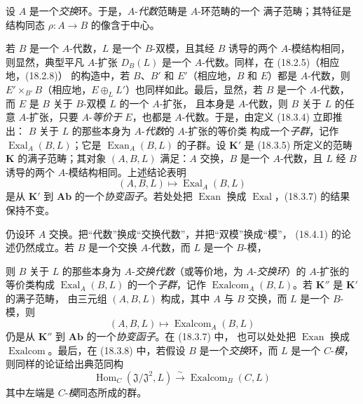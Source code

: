 \begin{env}[18.4.1]
\label{0.18.4.1-fr}
设 $A$ 是一个\emph{交换}环。于是，$A$-\emph{代数}范畴是 $A$-环范畴的一个
满子范畴；其特征是结构同态 $\rho:A\to B$ 的像含于中心。

若 $B$ 是一个 $A$-代数，$L$ 是一个 $B$-双模，且其经 $B$ 诱导的两个
$A$-模结构相同，则显然，典型平凡
$A$-扩张 $D_B(L)$ 是一个 $A$-代数。同样，在 (18.2.5)（相应地，(18.2.8)）
的构造中，若 $B$、$B'$ 和 $E'$（相应地，$B$ 和 $E$）都是 $A$-代数，则
$E'\times_{B'}B$（相应地，$E\oplus_LL'$）也同样如此。最后，显然，若
$B$ 是一个 $A$-代数，而 $E$ 是 $B$ 关于 $B$-双模 $L$ 的一个 $A$-扩张，
且本身是 $A$-代数，则 $B$ 关于 $L$ 的任意 $A$-扩张，只要
$A$-\emph{等价于} $E$，也都是 $A$-代数。于是，由定义 (18.3.4) 立即推出：
$B$ 关于 $L$ 的那些本身为 $A$-\emph{代数}的 $A$-扩张的等价类
构成一个\emph{子群}，记作 $\operatorname{Exal}_A(B,L)$；它是
$\operatorname{Exan}_A(B,L)$ 的子群。设 $\mathbf K'$ 是 (18.3.5) 所定义的范畴
$\mathbf K$ 的满子范畴；其对象 $(A,B,L)$ 满足：$A$ 交换，$B$ 是一个
$A$-代数，且 $L$ 经 $B$ 诱导的两个 $A$-模结构相同。上述结论表明
\[
  (A,B,L)\longmapsto\operatorname{Exal}_A(B,L)
\]
是从 $\mathbf K'$ 到 $\mathbf{Ab}$ 的一个\emph{协变函子}。若处处把
$\operatorname{Exan}$ 换成 $\operatorname{Exal}$，(18.3.7) 的结果保持不变。
\end{env}

\begin{env}[18.4.2]
\label{0.18.4.2-fr}
仍设环 $A$ 交换。把“代数”换成“交换代数”，并把“双模”换成“模”，
(18.4.1) 的论述仍然成立。若 $B$ 是一个交换 $A$-代数，而 $L$ 是一个
$B$-模，


则 $B$ 关于 $L$ 的那些本身为 $A$-\emph{交换代数}（或等价地，为
$A$-\emph{交换环}）的 $A$-扩张的等价类构成
$\operatorname{Exal}_A(B,L)$ 的一个\emph{子群}，记作
$\operatorname{Exalcom}_A(B,L)$。若 $\mathbf K''$ 是 $\mathbf K'$ 的满子范畴，
由三元组 $(A,B,L)$ 构成，其中 $A$ 与 $B$ 交换，而 $L$ 是一个 $B$-模，则
\[
  (A,B,L)\longmapsto\operatorname{Exalcom}_A(B,L)
\]
仍是从 $\mathbf K''$ 到 $\mathbf{Ab}$ 的一个\emph{协变函子}。在 (18.3.7) 中，
也可以处处把 $\operatorname{Exan}$ 换成 $\operatorname{Exalcom}$。最后，在
(18.3.8) 中，若假设 $B$ 是一个\emph{交换}环，而 $L$ 是一个 $C$-\emph{模}，
则同样的论证给出典范同构
\begin{equation}
\label{0.18.4.2.1-fr}
\tag{18.4.2.1}
  \operatorname{Hom}_C(\mathfrak J/\mathfrak J^2,L)
  \xrightarrow{\sim}\operatorname{Exalcom}_B(C,L)
\end{equation}
其中左端是 $C$-\emph{模}同态所成的群。
\end{env}

